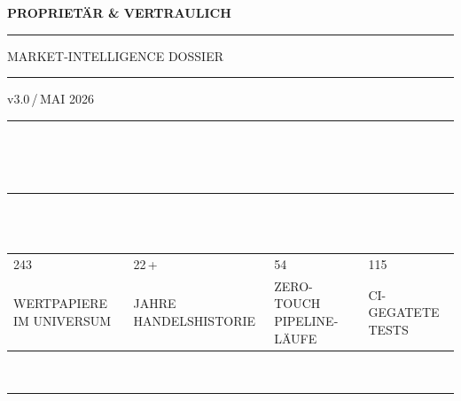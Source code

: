 \documentclass[11pt, a4paper, oneside, openany]{report}
\begin{document}
\begin{titlepage}
\pagestyle{empty}

\noindent\textcolor{N700}{\sffamily\fontsize{7.5}{9}\selectfont\bfseries
PROPRIETÄR \& VERTRAULICH \quad\textcolor{SwissRed}{\rule[0.5ex]{8pt}{1pt}}\quad
MARKET-INTELLIGENCE DOSSIER \quad\textcolor{SwissRed}{\rule[0.5ex]{8pt}{1pt}}\quad
v3.0\,/\,MAI 2026}
\vspace{3mm}
\noindent\textcolor{N300}{\rule{\textwidth}{0.4pt}}

\vspace{18mm}

\\[2pt]

\vspace{28mm}

\\[4mm]

\vspace{14mm}

\noindent\textcolor{N300}{\rule{\textwidth}{0.4pt}}\\[1mm]
\\[3mm]
\noindent\begin{tabular*}{\textwidth}{@{\extracolsep{\fill}}llll@{}}
{\datafont\fontsize{26}{30}\selectfont\color{DeepNavy}243} &
{\datafont\fontsize{26}{30}\selectfont\color{DeepNavy}22\,+} &
{\datafont\fontsize{26}{30}\selectfont\color{DeepNavy}54} &
{\datafont\fontsize{26}{30}\selectfont\color{DeepNavy}115} \\[1mm]
{\sffamily\fontsize{7}{9}\selectfont\color{N700}\MakeUppercase{Wertpapiere im Universum}} &
{\sffamily\fontsize{7}{9}\selectfont\color{N700}\MakeUppercase{Jahre Handelshistorie}} &
{\sffamily\fontsize{7}{9}\selectfont\color{N700}\MakeUppercase{Zero-Touch Pipeline-Läufe}} &
{\sffamily\fontsize{7}{9}\selectfont\color{N700}\MakeUppercase{CI-gegatete Tests}} \\
\end{tabular*}\\[2mm]
\noindent\textcolor{N300}{\rule{\textwidth}{0.4pt}}


\end{titlepage}
\end{document}
